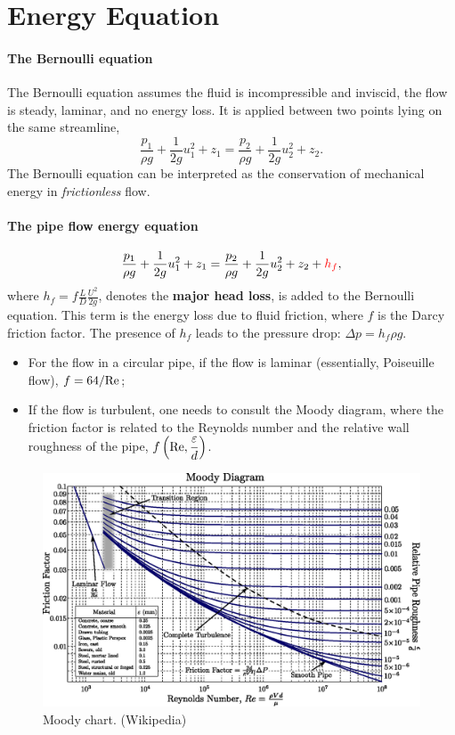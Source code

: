 \documentclass[a4paper]{article}
\begin{document}
\section{Energy Equation}
\paragraph{The Bernoulli equation} The Bernoulli equation assumes the fluid is incompressible and inviscid, the flow is steady, laminar, and no energy loss. It is applied between two points lying on the same streamline,
\[
    \frac{p_1}{\rho g} + \frac{1}{2g}u_1^2 + z_1 = \frac{p_2}{\rho g} + \frac{1}{2g}u_2^2 + z_2.
\]
The Bernoulli equation can be interpreted as the conservation of mechanical energy in \textit{frictionless} flow.

\paragraph{The pipe flow energy equation}
\[
    \frac{p_1}{\rho g} + \frac{1}{2g}u_1^2 + z_1 = \frac{p_2}{\rho g} + \frac{1}{2g}u_2^2 + z_2 + {\color{red} h_f},
\]
where $\displaystyle h_{f} = f\frac{L}{D}\frac{U^{2}}{2g}$, denotes the \textbf{major head loss}, is added to the Bernoulli equation. This term is the energy loss due to fluid friction, where $f$ is the Darcy friction factor. The presence of $h_f$ leads to the pressure drop: $\Delta p = h_f \rho g$.
\begin{itemize}
    \item For the flow in a circular pipe, if the flow is laminar (essentially, Poiseuille flow), $f = 64/{\rm Re}$;
    
    \item If the flow is turbulent, one needs to consult the Moody diagram, where the friction factor is related to the Reynolds number and the relative wall roughness of the pipe, $f\left({\rm Re}, \dfrac{\varepsilon}{d}\right)$.
\end{itemize}
\begin{figure}[H]
    \centering
    \includegraphics[scale=.75]{img/Moody_EN.eps}
    \caption{Moody chart. {\color{gray}(Wikipedia)}}
    \label{fig:moody}
\end{figure}
\end{document}
